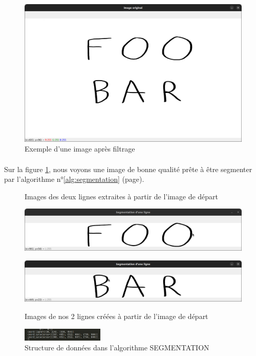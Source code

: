 \documentclass[a4paper]{article}
\begin{document}
			\begin{figure}
				\includegraphics[width=.75\textwidth]{segmentation_image_originel.png}
				\caption{Exemple d'une image après filtrage}
				\centering
				\label{fig:imageOriginel}
			\end{figure}
			\paragraph{} Sur la figure \ref{fig:imageOriginel}, nous voyons une image de bonne qualité prête à être segmenter par l'algorithme n°\ref{alg:segmentation} (page\pageref{alg:segmentation}). 
			\begin{figure}
				\caption{Images des deux lignes extraites à partir de l'image de départ}
				\includegraphics[width=.8\textwidth]{segmentation_ligne1.png}
				\caption{Images de nos 2 lignes créées à partir de l'image de départ}
				\centering
				\includegraphics[width=.8\textwidth]{segmentation_ligne2.png}
				\centering
				\label{fig:imageLignes}
			\end{figure}
			\begin{figure}
				\includegraphics[width=0.35\textwidth]{structDonnee.png}
				\caption{Structure de données dans l'algorithme SEGMENTATION}
					\label{fig:structDonnee}
			\end{figure}
\end{document}
